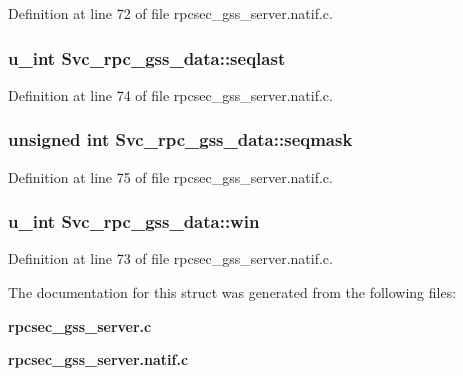 Definition at line 72 of file rpcsec\_\-gss\_\-server.natif.c.
\subsubsection{\setlength{\rightskip}{0pt plus 5cm}u\_\-int {\bf Svc\_\-rpc\_\-gss\_\-data::seqlast}}\label{structSvc__rpc__gss__data_o6}




Definition at line 74 of file rpcsec\_\-gss\_\-server.natif.c.
\subsubsection{\setlength{\rightskip}{0pt plus 5cm}unsigned int {\bf Svc\_\-rpc\_\-gss\_\-data::seqmask}}\label{structSvc__rpc__gss__data_o7}




Definition at line 75 of file rpcsec\_\-gss\_\-server.natif.c.
\subsubsection{\setlength{\rightskip}{0pt plus 5cm}u\_\-int {\bf Svc\_\-rpc\_\-gss\_\-data::win}}\label{structSvc__rpc__gss__data_o5}




Definition at line 73 of file rpcsec\_\-gss\_\-server.natif.c.

The documentation for this struct was generated from the following files:\begin{CompactItemize}
\item 
{\bf rpcsec\_\-gss\_\-server.c}\item 
{\bf rpcsec\_\-gss\_\-server.natif.c}\end{CompactItemize}

